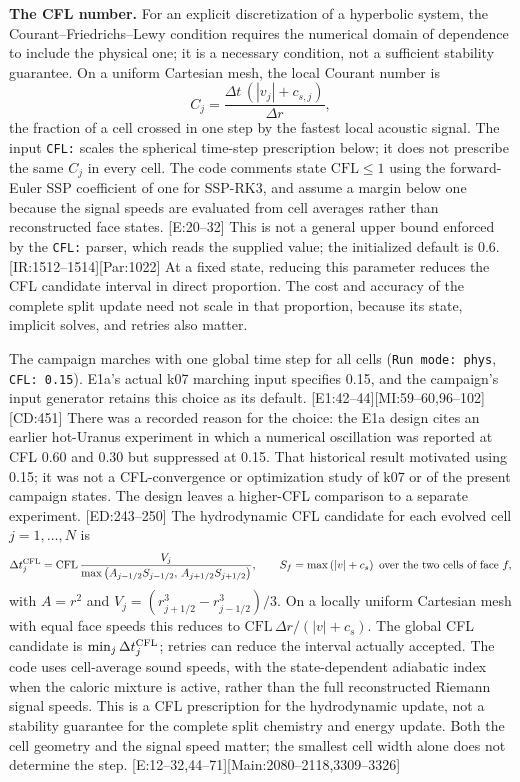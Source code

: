 \documentclass[english,a4paper]{my_memo}
\newcommand{\ev}[2]{\textnormal{\small[#1:#2]}}
\begin{document}
\textbf{The CFL number.} For an explicit discretization of a hyperbolic
system, the Courant--Friedrichs--Lewy condition requires the numerical domain
of dependence to include the physical one; it is a necessary condition, not
a sufficient stability guarantee. On a uniform Cartesian mesh, the local
Courant number is
\begin{equation}
C_j=\frac{\Delta t\,(|v_j|+c_{s,j})}{\Delta r},
\end{equation}
the fraction of a cell crossed in one step by the fastest local acoustic
signal. The input \texttt{CFL:} scales the spherical time-step prescription
below; it does not prescribe the same $C_j$ in every cell. The code comments
state $\mathrm{CFL}\le1$ using the forward-Euler SSP coefficient of one for
SSP-RK3, and assume a margin below one because the signal speeds are evaluated
from cell averages rather than reconstructed face states.
\ev{E}{20--32} This is not a general upper bound enforced by the
\texttt{CFL:} parser, which reads the supplied value; the initialized default
is 0.6. \ev{IR}{1512--1514}\ev{Par}{1022} At a fixed state, reducing this
parameter reduces the CFL candidate interval in direct proportion. The cost
and accuracy of the complete split update need not scale in that proportion,
because its state, implicit solves, and retries also matter.

The campaign marches with one global time step for all cells
(\texttt{Run mode: phys}, \texttt{CFL: 0.15}). E1a's actual k07 marching
input specifies 0.15, and the campaign's input generator retains this choice
as its default. \ev{E1}{42--44}\ev{MI}{59--60,96--102}\ev{CD}{451}
There was a recorded reason for the choice: the E1a design cites an earlier
hot-Uranus experiment in which a numerical oscillation was reported at
CFL 0.60 and 0.30 but suppressed at 0.15. That historical result motivated
using 0.15; it was not a CFL-convergence or optimization study of k07 or of
the present campaign states. The design leaves a higher-CFL comparison to a
separate experiment. \ev{ED}{243--250} The hydrodynamic CFL candidate
for each evolved cell $j=1,\ldots,N$ is
\begin{equation}
\Delta t_j^{\rm CFL}=\mathrm{CFL}\,\frac{V_j}{\max\left(A_{j-1/2}S_{j-1/2},\,
A_{j+1/2}S_{j+1/2}\right)},\qquad
S_f=\max\left(|v|+c_s\right)\ \text{over the two cells of face } f,
\end{equation}
with $A=r^2$ and $V_j=(r_{j+1/2}^3-r_{j-1/2}^3)/3$. On a locally uniform
Cartesian mesh with equal face speeds this reduces to
$\mathrm{CFL}\,\Delta r/(|v|+c_s)$. The global CFL candidate is
$\min_j\Delta t_j^{\rm CFL}$; retries can reduce the interval actually
accepted. The code uses cell-average sound speeds, with the state-dependent
adiabatic index when the caloric mixture is active, rather than the full
reconstructed Riemann signal speeds. This is a CFL prescription for the
hydrodynamic update, not a stability guarantee for the complete split
chemistry and energy update. Both the cell geometry and the signal speed
matter; the smallest cell width alone does not determine the step.
\ev{E}{12--32,44--71}\ev{Main}{2080--2118,3309--3326}
\end{document}
